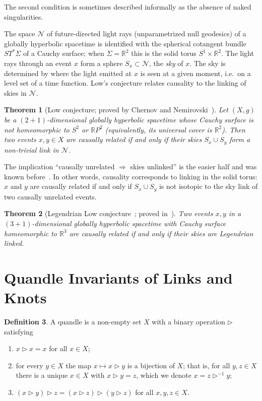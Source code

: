 \documentclass[11pt]{article}
\newtheorem{theorem}{Theorem}[section]
\theoremstyle{definition}
\newtheorem{definition}[theorem]{Definition}
\newcommand{\R}{\mathbb{R}}
\newcommand{\tr}{\triangleright}
\newcommand{\tri}{\triangleright^{-1}}
\begin{document}
The second condition is sometimes described informally as the absence of naked singularities.

The space $\mathcal N$ of future-directed light rays (unparametrized null geodesics) of a globally
hyperbolic spacetime is identified with the spherical cotangent bundle $ST^*\Sigma$ of a Cauchy
surface; when $\Sigma=\R^2$ this is the solid torus $S^1\times\R^2$. The light rays through an event
$x$ form a sphere $S_x\subset\mathcal N$, the \emph{sky} of $x$. The sky is determined by where the
light emitted at $x$ is seen at a given moment, i.e.\ on a level set of a time function. Low's
conjecture relates causality to the linking of skies in $\mathcal N$.

\begin{theorem}[Low conjecture; proved by Chernov and Nemirovski~\cite{CN10}]
Let $(X,g)$ be a $(2+1)$-dimensional globally hyperbolic spacetime whose Cauchy surface is not
homeomorphic to $S^2$ or $\R P^2$ (equivalently, its universal cover is $\R^2$). Then two events
$x,y\in X$ are causally related if and only if their skies $S_x\cup S_y$ form a non-trivial link in
$\mathcal N$.
\end{theorem}

The implication ``causally unrelated $\Rightarrow$ skies unlinked'' is the easier half and was known
before~\cite{CN10}. In other words, causality corresponds to linking in the solid torus: $x$ and $y$
are causally related if and only if $S_x\cup S_y$ is not isotopic to the sky link of two causally
unrelated events.

\begin{theorem}[Legendrian Low conjecture~\cite{NT04}; proved in~\cite{CN10}]
Two events $x,y$ in a $(3+1)$-dimensional globally hyperbolic spacetime with Cauchy surface
homeomorphic to $\R^3$ are causally related if and only if their skies are Legendrian linked.
\end{theorem}

\section{Quandle Invariants of Links and Knots}\label{sec:quandles}

\begin{definition}
A quandle is a non-empty set $X$ with a binary operation $\tr$ satisfying
\begin{enumerate}
\item $x\tr x=x$ for all $x\in X$;
\item for every $y\in X$ the map $x\mapsto x\tr y$ is a bijection of $X$; that is, for all
$y,z\in X$ there is a unique $x\in X$ with $x\tr y=z$, which we denote $x=z\tri y$;
\item $(x\tr y)\tr z=(x\tr z)\tr(y\tr z)$ for all $x,y,z\in X$.
\end{enumerate}
\end{definition}
\end{document}
